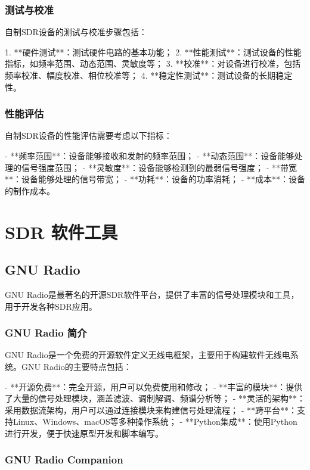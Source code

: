 ﻿\documentclass[UTF8]{ctexbook}
\begin{document}
\subsection{测试与校准}

自制SDR设备的测试与校准步骤包括：

1. **硬件测试**：测试硬件电路的基本功能；
2. **性能测试**：测试设备的性能指标，如频率范围、动态范围、灵敏度等；
3. **校准**：对设备进行校准，包括频率校准、幅度校准、相位校准等；
4. **稳定性测试**：测试设备的长期稳定性。

\subsection{性能评估}

自制SDR设备的性能评估需要考虑以下指标：

- **频率范围**：设备能够接收和发射的频率范围；
- **动态范围**：设备能够处理的信号强度范围；
- **灵敏度**：设备能够检测到的最弱信号强度；
- **带宽**：设备能够处理的信号带宽；
- **功耗**：设备的功率消耗；
- **成本**：设备的制作成本。

\chapter{SDR 软件工具}

\section{GNU Radio}

GNU Radio是最著名的开源SDR软件平台，提供了丰富的信号处理模块和工具，用于开发各种SDR应用。

\subsection{GNU Radio 简介}

GNU Radio是一个免费的开源软件定义无线电框架，主要用于构建软件无线电系统。GNU Radio的主要特点包括：

- **开源免费**：完全开源，用户可以免费使用和修改；
- **丰富的模块**：提供了大量的信号处理模块，涵盖滤波、调制解调、频谱分析等；
- **灵活的架构**：采用数据流架构，用户可以通过连接模块来构建信号处理流程；
- **跨平台**：支持Linux、Windows、macOS等多种操作系统；
- **Python集成**：使用Python进行开发，便于快速原型开发和脚本编写。

\subsection{GNU Radio Companion}
\end{document}

